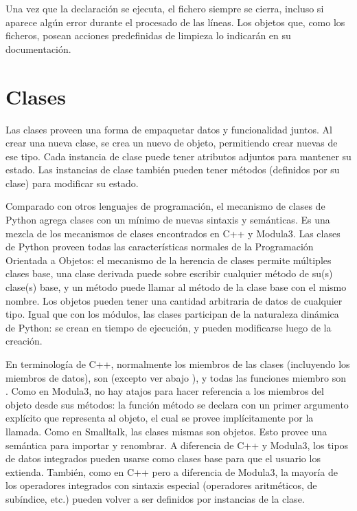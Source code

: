 \documentclass[a4,10pt,spanish]{sphinxmanual}
\begin{document}
\sphinxAtStartPar
Una vez que la declaración se ejecuta, el fichero  siempre se cierra, incluso si aparece algún error durante el procesado de las líneas.  Los objetos que, como los ficheros, posean acciones predefinidas de limpieza lo indicarán en su documentación.


\chapter{Clases}
\label{\detokenize{tutorial/classes:classes}}\label{\detokenize{tutorial/classes:tut-classes}}\label{\detokenize{tutorial/classes::doc}}
\sphinxAtStartPar
Las clases proveen una forma de empaquetar datos y funcionalidad juntos. Al crear una nueva clase, se crea un nuevo  de objeto, permitiendo crear nuevas  de ese tipo. Cada instancia de clase puede tener atributos adjuntos para mantener su estado. Las instancias de clase también pueden tener métodos (definidos por su clase) para modificar su estado.

\sphinxAtStartPar
Comparado con otros lenguajes de programación, el mecanismo de clases de Python agrega clases con un mínimo de nuevas sintaxis y semánticas.  Es una mezcla de los mecanismos de clases encontrados en C++ y Modula\sphinxhyphen{}3.  Las clases de Python proveen todas las características normales de la Programación Orientada a Objetos: el mecanismo de la herencia de clases permite múltiples clases base, una clase derivada puede sobre escribir cualquier método de su(s) clase(s) base, y un método puede llamar al método de la clase base con el mismo nombre.  Los objetos pueden tener una cantidad arbitraria de datos de cualquier tipo.  Igual que con los módulos, las clases participan de la naturaleza dinámica de Python: se crean en tiempo de ejecución, y pueden modificarse luego de la creación.

\sphinxAtStartPar
En terminología de C++, normalmente los miembros de las clases (incluyendo los miembros de datos), son  (excepto ver abajo {\hyperref[\detokenize{tutorial/classes:tut-private}]{}}), y todas las funciones miembro son .  Como en Modula\sphinxhyphen{}3, no hay atajos para hacer referencia a los miembros del objeto desde sus métodos: la función método se declara con un primer argumento explícito que representa al objeto, el cual se provee implícitamente por la llamada.  Como en Smalltalk, las clases mismas son objetos.  Esto provee una semántica para importar y renombrar.  A diferencia de C++ y Modula\sphinxhyphen{}3, los tipos de datos integrados pueden usarse como clases base para que el usuario los extienda.  También, como en C++ pero a diferencia de Modula\sphinxhyphen{}3, la mayoría de los operadores integrados con sintaxis especial (operadores aritméticos, de sub\sphinxhyphen{}índice, etc.) pueden volver a ser definidos por instancias de la clase.
\end{document}
